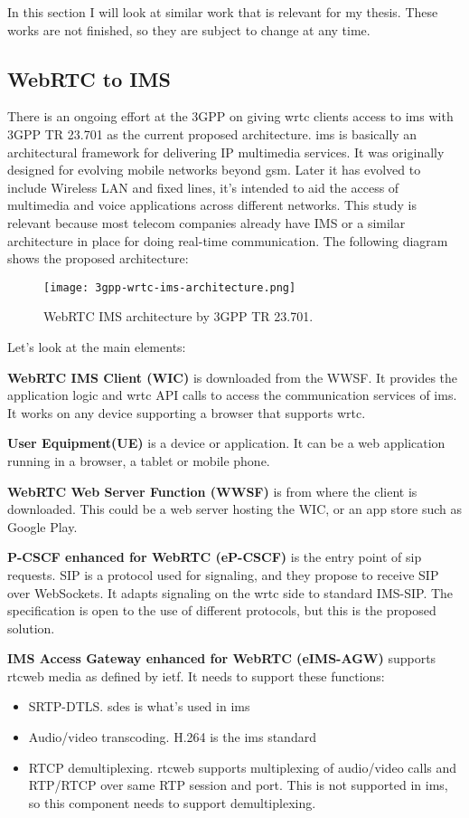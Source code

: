 In this section I will look at similar work that is relevant for my thesis. These works are not finished, so they are subject to change at any time.

\subsection{WebRTC to IMS}
There is an ongoing effort at the 3GPP on giving \gls{wrtc} clients access to \gls{ims} with 3GPP TR 23.701\cite{3gpp-wrtc-access-ims} as the current proposed architecture. \gls{ims} is basically an architectural framework for delivering IP multimedia services. It was originally designed for evolving mobile networks beyond \gls{gsm}. Later it has evolved to include Wireless LAN and fixed lines, it's intended to aid the access of multimedia and voice applications across different networks. This study is relevant because most telecom companies already have IMS or a similar architecture in place for doing real-time communication. The following diagram shows the proposed architecture:

\begin{figure}[here]
\centerline{\texttt{[image: 3gpp-wrtc-ims-architecture.png]}}
\caption{WebRTC IMS architecture by 3GPP TR 23.701.}
\label{fig:wrtc-ims-architecture}
\end{figure}

Let's look at the main elements:

\textbf{WebRTC IMS Client (WIC)}
is downloaded from the WWSF. It provides the application logic and \gls{wrtc} API calls to access the communication services of \gls{ims}. It works on any device supporting a browser that supports \gls{wrtc}.

\textbf{User Equipment(UE)}
is a device or application. It can be a web application running in a browser, a tablet or mobile phone.

\textbf{WebRTC Web Server Function (WWSF)}
is from where the client is downloaded. This could be a web server hosting the WIC, or an app store such as Google Play.

\textbf{P-CSCF enhanced for WebRTC (eP-CSCF)}
is the entry point of \gls{sip} requests. SIP is a protocol used for signaling, and they propose to receive SIP over WebSockets. It adapts signaling on the \gls{wrtc} side to standard IMS-SIP. The specification is open to the use of different protocols, but this is the proposed solution.

\textbf{IMS Access Gateway enhanced for WebRTC (eIMS-AGW)}
supports \gls{rtcweb} media as defined by \gls{ietf}. It needs to support these functions:
\begin{itemize}
\item{SRTP-DTLS. \gls{sdes} is what's used in \gls{ims}}
\item{Audio/video transcoding. H.264 is the \gls{ims} standard}
\item{RTCP demultiplexing. \gls{rtcweb} supports multiplexing of audio/video calls and RTP/RTCP over same RTP session and port. This is not supported in \gls{ims}, so this component needs to support demultiplexing.}
\end{itemize}

